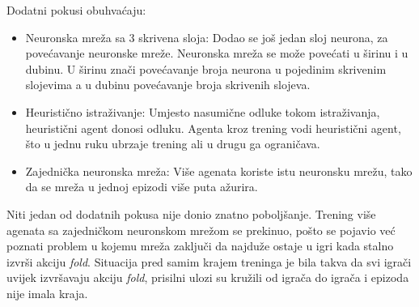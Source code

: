 Dodatni pokusi obuhvaćaju:
\begin{itemize}
	\item Neuronska mreža sa 3 skrivena sloja: Dodao se još jedan sloj neurona, za povećavanje neuronske mreže. Neuronska mreža se može povećati u širinu i u dubinu. U širinu znači povećavanje broja neurona u pojedinim skrivenim slojevima a u dubinu povećavanje broja skrivenih slojeva.
	\item Heuristično istraživanje: Umjesto nasumične odluke tokom istraživanja, heuristični agent donosi odluku. Agenta kroz trening vodi heuristični agent, što u jednu ruku ubrzaje trening ali u drugu ga ograničava.
	\item Zajednička neuronska mreža: Više agenata koriste istu neuronsku mrežu, tako da se mreža u jednoj epizodi više puta ažurira. 
\end{itemize}

Niti jedan od dodatnih pokusa nije donio znatno poboljšanje. Trening više agenata sa zajedničkom neuronskom mrežom se prekinuo, pošto se pojavio već poznati problem u kojemu mreža zaključi da najduže ostaje u igri kada stalno izvrši akciju \textit{fold}. Situacija pred samim krajem treninga je bila takva da svi igrači uvijek izvršavaju akciju \textit{fold}, prisilni ulozi su kružili od igrača do igrača i epizoda nije imala kraja.
